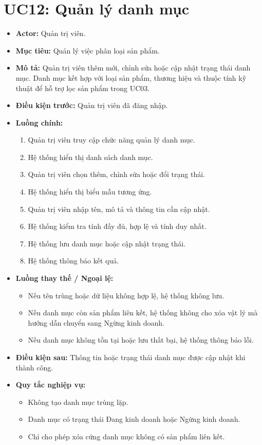 \section{UC12: Quản lý danh mục}
\begin{itemize}
    \item \textbf{Actor:} Quản trị viên.
    \item \textbf{Mục tiêu:} Quản lý việc phân loại sản phẩm.
    \item \textbf{Mô tả:} Quản trị viên thêm mới, chỉnh sửa hoặc cập nhật trạng thái danh mục. Danh mục kết hợp với loại sản phẩm, thương hiệu và thuộc tính kỹ thuật để hỗ trợ lọc sản phẩm trong UC03.
    \item \textbf{Điều kiện trước:} Quản trị viên đã đăng nhập.
    \item \textbf{Luồng chính:}
    \begin{enumerate}
        \item Quản trị viên truy cập chức năng quản lý danh mục.
        \item Hệ thống hiển thị danh sách danh mục.
        \item Quản trị viên chọn thêm, chỉnh sửa hoặc đổi trạng thái.
        \item Hệ thống hiển thị biểu mẫu tương ứng.
        \item Quản trị viên nhập tên, mô tả và thông tin cần cập nhật.
        \item Hệ thống kiểm tra tính đầy đủ, hợp lệ và tính duy nhất.
        \item Hệ thống lưu danh mục hoặc cập nhật trạng thái.
        \item Hệ thống thông báo kết quả.
    \end{enumerate}
    \item \textbf{Luồng thay thế / Ngoại lệ:}
    \begin{itemize}
        \item Nếu tên trùng hoặc dữ liệu không hợp lệ, hệ thống không lưu.
        \item Nếu danh mục còn sản phẩm liên kết, hệ thống không cho xóa vật lý mà hướng dẫn chuyển sang Ngừng kinh doanh.
        \item Nếu danh mục không tồn tại hoặc lưu thất bại, hệ thống thông báo lỗi.
    \end{itemize}
    \item \textbf{Điều kiện sau:} Thông tin hoặc trạng thái danh mục được cập nhật khi thành công.
    \item \textbf{Quy tắc nghiệp vụ:}
    \begin{itemize}
        \item Không tạo danh mục trùng lặp.
        \item Danh mục có trạng thái Đang kinh doanh hoặc Ngừng kinh doanh.
        \item Chỉ cho phép xóa cứng danh mục không có sản phẩm liên kết.
    \end{itemize}
\end{itemize}

